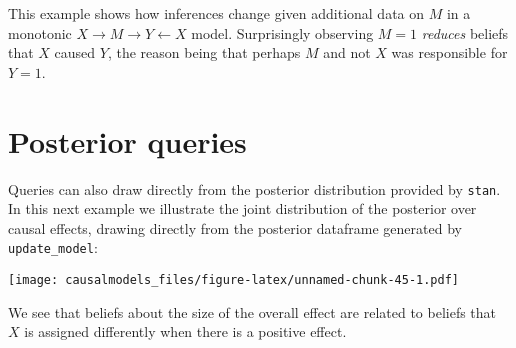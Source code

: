 \documentclass[
  12pt,
]{book}
\newenvironment{Shaded}{\begin{snugshade}}{\end{snugshade}}
\newcommand{\AttributeTok}[1]{\textcolor[rgb]{0.13,0.29,0.53}{#1}}
\newcommand{\DecValTok}[1]{\textcolor[rgb]{0.00,0.00,0.81}{#1}}
\newcommand{\FloatTok}[1]{\textcolor[rgb]{0.00,0.00,0.81}{#1}}
\newcommand{\FunctionTok}[1]{\textcolor[rgb]{0.13,0.29,0.53}{\textbf{#1}}}
\newcommand{\NormalTok}[1]{#1}
\newcommand{\OtherTok}[1]{\textcolor[rgb]{0.56,0.35,0.01}{#1}}
\newcommand{\SpecialCharTok}[1]{\textcolor[rgb]{0.81,0.36,0.00}{\textbf{#1}}}
\newcommand{\StringTok}[1]{\textcolor[rgb]{0.31,0.60,0.02}{#1}}
\begin{document}
This example shows how inferences change given additional data on \(M\) in a monotonic \(X \rightarrow M \rightarrow Y \leftarrow X\) model. Surprisingly observing \(M=1\) \emph{reduces} beliefs that \(X\) caused \(Y\), the reason being that perhaps \(M\) and not \(X\) was responsible for \(Y=1\).

\hypertarget{posterior-queries}{%
\section{Posterior queries}\label{posterior-queries}}

Queries can also draw directly from the posterior distribution provided by \texttt{stan}. In this next example we illustrate the joint distribution of the posterior over causal effects, drawing directly from the posterior dataframe generated by \texttt{update\_model}:

\begin{Shaded}
\end{Shaded}

\texttt{[image: causalmodels\_files/figure-latex/unnamed-chunk-45-1.pdf]}

We see that beliefs about the size of the overall effect are related to beliefs that \(X\) is assigned differently when there is a positive effect.
\end{document}
